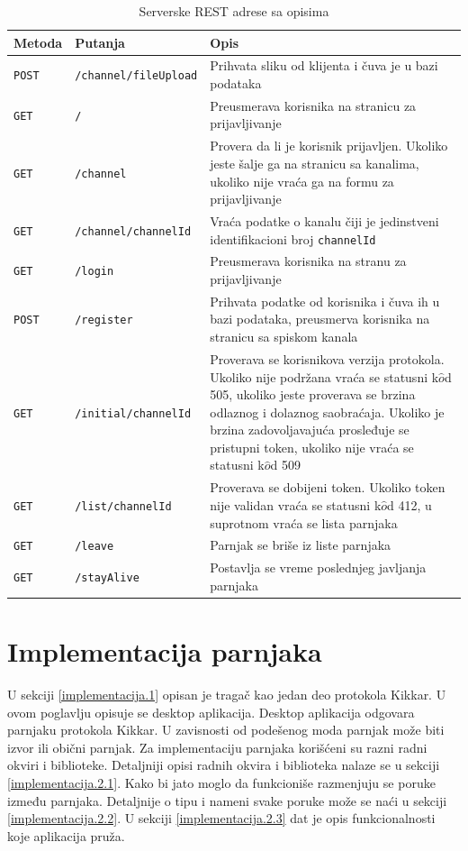 \documentclass[12pt,oneside]{memoir}
\begin{document}
\begin{table}[h]
\caption{Serverske REST adrese sa opisima} 
\centering
\begin{tabular}{ |p{1.5cm}|p{4cm}|p{8cm}| } 
\hline
Metoda & Putanja & Opis \\
\hline
\texttt{POST} & \texttt{/channel/fileUpload} & Prihvata sliku od klijenta i čuva je u bazi podataka \\
\texttt{GET} & \texttt{/} & Preusmerava korisnika na stranicu za prijavljivanje \\ 
\texttt{GET} & \texttt{/channel} & Provera da li je korisnik prijavljen. Ukoliko jeste šalje ga na stranicu sa kanalima, ukoliko nije vraća ga na formu za prijavljivanje \\ 
\texttt{GET} & \texttt{/channel/{channelId}} & Vraća podatke o kanalu čiji je jedinstveni identifikacioni broj \texttt{{channelId}}\\
\texttt{GET} & \texttt{/login} & Preusmerava korisnika na stranu za prijavljivanje \\ 
\texttt{POST} & \texttt{/register} & Prihvata podatke od korisnika i čuva ih u bazi podataka, preusmerva korisnika na stranicu sa spiskom kanala \\ 
\texttt{GET} & \texttt{/initial/{channelId}} & Proverava se korisnikova verzija protokola. Ukoliko nije podržana vraća se statusni k$\hat{o}$d 505, ukoliko jeste proverava se brzina odlaznog i dolaznog saobraćaja. Ukoliko je brzina zadovoljavajuća prosleđuje se pristupni token, ukoliko nije vraća se statusni k$\hat{o}$d 509 \\ 
\texttt{GET} & \texttt{/list/{channelId}} & Proverava se dobijeni token. Ukoliko token nije validan vraća se statusni k$\hat{o}$d 412, u suprotnom vraća se lista parnjaka \\ 
\texttt{GET} & \texttt{/leave} & Parnjak se briše iz liste parnjaka \\ 
\texttt{GET} & \texttt{/stayAlive} & Postavlja se vreme poslednjeg javljanja parnjaka \\ 
\hline
\end{tabular}
\end{table}
\newpage

\section{Implementacija parnjaka}
\label{implementacija.2}

U sekciji \ref{implementacija.1} opisan je tragač kao jedan deo protokola Kikkar. U ovom poglavlju opisuje se desktop aplikacija. Desktop aplikacija odgovara parnjaku protokola Kikkar. U zavisnosti od podešenog moda parnjak može biti izvor ili obični parnjak. Za implementaciju parnjaka korišćeni su razni radni okviri i biblioteke. Detaljniji opisi radnih okvira i biblioteka nalaze se u sekciji \ref{implementacija.2.1}. Kako bi jato moglo da funkcioniše razmenjuju se poruke između parnjaka. Detaljnije o tipu i nameni svake poruke može se naći u sekciji \ref{implementacija.2.2}. U sekciji \ref{implementacija.2.3} dat je opis funkcionalnosti koje aplikacija pruža.
\end{document}
